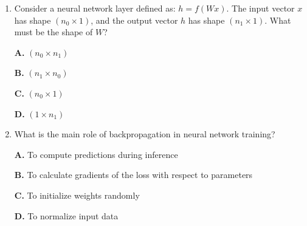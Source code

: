 \documentclass[11pt]{article}
\begin{document}
\begin{enumerate}[label=Q\arabic*., leftmargin=*]
\item Consider a neural network layer defined as: $h = f(Wx)$. The input vector $x$ has shape $(n_0 \times 1)$, and the output vector $h$ has shape $(n_1 \times 1)$. What must be the shape of $W$?

\textbf{A.} $(n_0 \times n_1)$

\textbf{B.} $(n_1 \times n_0)$

\textbf{C.} $(n_0 \times 1)$

\textbf{D.} $(1 \times n_1)$

\item What is the main role of backpropagation in neural network training?

\textbf{A.} To compute predictions during inference

\textbf{B.} To calculate gradients of the loss with respect to parameters

\textbf{C.} To initialize weights randomly

\textbf{D.} To normalize input data

\end{enumerate}
\end{document}
